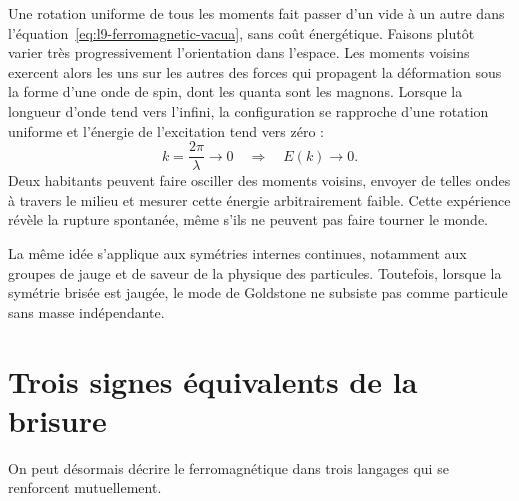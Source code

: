 Une rotation uniforme de tous les moments fait passer d’un vide à un autre dans l’équation~\eqref{eq:l9-ferromagnetic-vacua}, sans coût énergétique. Faisons plutôt varier très progressivement l’orientation dans l’espace. Les moments voisins exercent alors les uns sur les autres des forces qui propagent la déformation sous la forme d’une onde de spin, dont les quanta sont les magnons. Lorsque la longueur d’onde tend vers l’infini, la configuration se rapproche d’une rotation uniforme et l’énergie de l’excitation tend vers zéro :
\begin{equation}
k=\frac{2\pi}{\lambda}\longrightarrow0
\quad\Longrightarrow\quad
E(k)\longrightarrow0.
\label{eq:l9-gapless-magnon}
\end{equation}
Deux habitants peuvent faire osciller des moments voisins, envoyer de telles ondes à travers le milieu et mesurer cette énergie arbitrairement faible. Cette expérience révèle la rupture spontanée, même s’ils ne peuvent pas faire tourner le monde.


La même idée s’applique aux symétries internes continues, notamment aux groupes de jauge et de saveur de la physique des particules. Toutefois, lorsque la symétrie brisée est jaugée, le mode de Goldstone ne subsiste pas comme particule sans masse indépendante.

\begin{classroomqa}\end{classroomqa}

\section{Trois signes équivalents de la brisure}

On peut désormais décrire le ferromagnétique dans trois langages qui se renforcent mutuellement.

